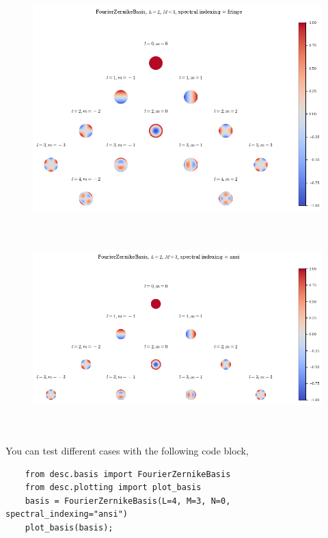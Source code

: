 \begin{minipage}[c][8cm][c]{\textwidth}
    \begin{minipage}[t][6cm][t]{0.5\textwidth}
        \begin{figure}[H]
            \centering
            \includegraphics[width=\textwidth,height=8cm,keepaspectratio]{figures/fringeL2M3.png}
        \end{figure}
    \end{minipage}
    \begin{minipage}[t][6cm][t]{0.5\textwidth}
        \begin{figure}[H]
            \centering
            \includegraphics[width=\textwidth,height=8cm,keepaspectratio]{figures/ansiL2M3.png}
        \end{figure}
    \end{minipage}
\end{minipage}
\pagebreak

You can test different cases with the following code block,
\begin{verbatim}
    from desc.basis import FourierZernikeBasis
    from desc.plotting import plot_basis
    basis = FourierZernikeBasis(L=4, M=3, N=0, spectral_indexing="ansi")
    plot_basis(basis);
\end{verbatim}








